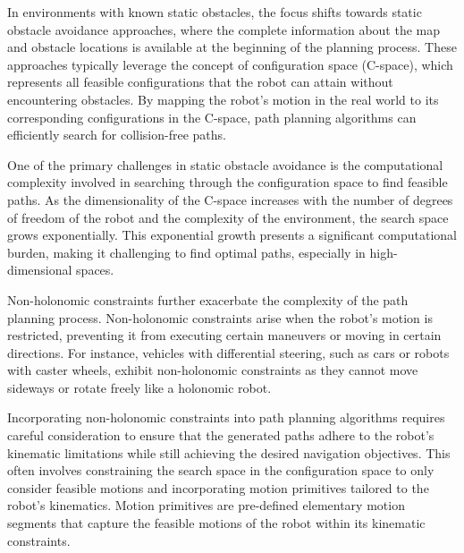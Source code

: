 \vspace*{6mm}

In environments with known static obstacles, the focus shifts towards static obstacle avoidance approaches, where the complete information about the map and obstacle locations is available at the beginning of the planning process. These approaches typically leverage the concept of configuration space (C-space), which represents all feasible configurations that the robot can attain without encountering obstacles. By mapping the robot's motion in the real world to its corresponding configurations in the C-space, path planning algorithms can efficiently search for collision-free paths.

\vspace*{6mm}

One of the primary challenges in static obstacle avoidance is the computational complexity involved in searching through the configuration space to find feasible paths. As the dimensionality of the C-space increases with the number of degrees of freedom of the robot and the complexity of the environment, the search space grows exponentially. This exponential growth presents a significant computational burden, making it challenging to find optimal paths, especially in high-dimensional spaces.

\vspace*{6mm}

Non-holonomic constraints further exacerbate the complexity of the path planning process. Non-holonomic constraints arise when the robot's motion is restricted, preventing it from executing certain maneuvers or moving in certain directions. For instance, vehicles with differential steering, such as cars or robots with caster wheels, exhibit non-holonomic constraints as they cannot move sideways or rotate freely like a holonomic robot.

\vspace*{6mm}

Incorporating non-holonomic constraints into path planning algorithms requires careful consideration to ensure that the generated paths adhere to the robot's kinematic limitations while still achieving the desired navigation objectives. This often involves constraining the search space in the configuration space to only consider feasible motions and incorporating motion primitives tailored to the robot's kinematics. Motion primitives are pre-defined elementary motion segments that capture the feasible motions of the robot within its kinematic constraints.

